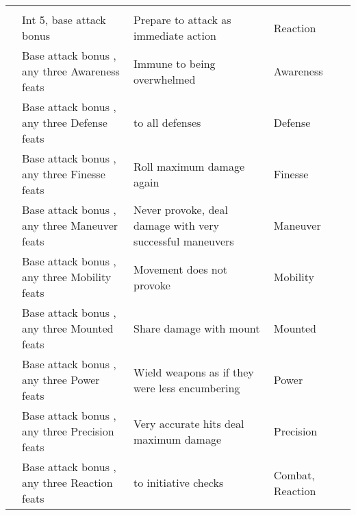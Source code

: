 {\begin{longtabu}{>{\lcol}p{10em} >{\lcol}p{15em} >{\lcol}X >{\lcol}p{6em} >{\lcol}p{3em}}
        \midrule
         &  &  &  &  \\
         & Int 5, base attack bonus  & Prepare to attack as immediate action & Reaction &  \\
         & Base attack bonus , any three Awareness feats & Immune to being overwhelmed & Awareness &  \\
         & Base attack bonus , any three Defense feats &  to all defenses & Defense &  \\
         & Base attack bonus , any three Finesse feats & Roll maximum damage again & Finesse &  \\
         & Base attack bonus , any three Maneuver feats & Never provoke, deal damage with very successful maneuvers & Maneuver &  \\
         & Base attack bonus , any three Mobility feats & Movement does not provoke & Mobility&  \\
         & Base attack bonus , any three Mounted feats & Share damage with mount & Mounted&  \\
         & Base attack bonus , any three Power feats & Wield weapons as if they were less encumbering & Power&  \\
         & Base attack bonus , any three Precision feats & Very accurate hits deal maximum damage & Precision &  \\
         & Base attack bonus , any three Reaction feats &  to initiative checks & Combat, Reaction &  \\


\end{longtabu}}
